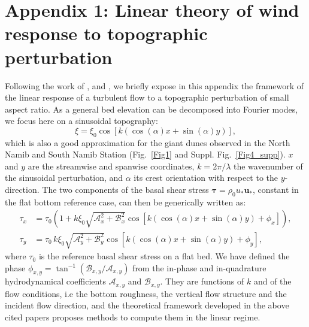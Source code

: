 \section*{Appendix 1: Linear theory of wind response to topographic perturbation}
\label{turbulent_wind_model}

Following the work of \citet{Fourriere2010}, \citet{Andreotti2012} and \citet{andreotti2009}, we briefly expose in this appendix the framework of the linear response of a turbulent flow to a topographic perturbation of small aspect ratio. As a general bed elevation can be decomposed into Fourier modes, we focus here on a sinusoidal topography:
%
\begin{equation}
\xi = \xi_{0}\cos\left[k\left(\cos(\alpha)x + \sin(\alpha)y\right)\right],
\end{equation}
%
which is also a good approximation for the giant dunes observed in the North Namib and South Namib Station (Fig.~\ref{Fig1} and Suppl. Fig.~\ref{Fig4_supp}). $x$ and $y$ are the streamwise and spanwise coordinates, $k=2\pi/\lambda$ the wavenumber of the sinusoidal perturbation, and $\alpha$ its crest orientation with respect to the $y$-direction. The two components of the basal shear stress $\boldsymbol{\tau} = \rho_{0} u_{*}\boldsymbol{u}_{*}$, constant in the flat bottom reference case, can then be generically written as:
%
\begin{align}
\tau_{x} & = \tau_{0}\left(1 + k\xi_{0}\sqrt{\mathcal{A}_{x}^{2} + \mathcal{B}_{x}^{2}}\cos\left[k\left(\cos(\alpha)x + \sin(\alpha)y\right) + \phi_{x}\right]\right), \\
\tau_{y} & = \tau_{0} \, k\xi_{0}\sqrt{\mathcal{A}_{y}^{2} + \mathcal{B}_{y}^{2}}\cos\left[k\left(\cos(\alpha)x + \sin(\alpha)y\right) + \phi_{y}\right],
\end{align}
%
where $\tau_{0}$ is the reference basal shear stress on a flat bed. We have defined the phase $\phi_{x, y} = \tan^{-1}\left(\mathcal{B}_{x, y}/\mathcal{A}_{x, y}\right)$ from the in-phase and in-quadrature hydrodynamical coefficients $\mathcal{A}_{x, y}$ and $\mathcal{B}_{x, y}$. They are functions of $k$ and of the flow conditions, i.e the bottom roughness, the vertical flow structure and the incident flow direction, and the theoretical framework developed in the above cited papers proposes methods to compute them in the linear regime.

